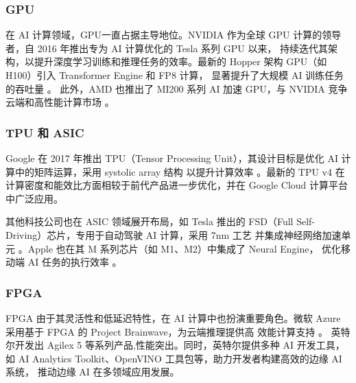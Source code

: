 \subsubsection{GPU}

在 AI 计算领域，GPU一直占据主导地位。NVIDIA 作为全球 GPU 计算的领导者，自 2016 年推出专为 AI 计算优化的 Tesla 系列 GPU 以来，
持续迭代其架构，以提升深度学习训练和推理任务的效率。最新的 Hopper 架构 GPU（如 H100）引入 Transformer Engine 和 FP8 计算，
显著提升了大规模 AI 训练任务的吞吐量 \cite{choquette2023nvidia}。
此外，AMD 也推出了 MI200 系列 AI 加速 GPU，与 NVIDIA 竞争云端和高性能计算市场 \cite{smith2022amd}。

\subsubsection{TPU 和 ASIC}

Google 在 2017 年推出 TPU（Tensor Processing Unit），其设计目标是优化 AI 计算中的矩阵运算，采用 systolic array 结构
以提升计算效率 \cite{jouppi2017datacenter}。最新的 TPU v4 在计算密度和能效比方面相较于前代产品进一步优化，并在 Google Cloud 计算平台中广泛应用。

其他科技公司也在 ASIC 领域展开布局，如 Tesla 推出的 FSD（Full Self-Driving）芯片，专用于自动驾驶 AI 计算，采用 7nm 工艺
并集成神经网络加速单元 \cite{talpes2020compute}。Apple 也在其 M 系列芯片（如 M1、M2）中集成了 Neural Engine，
优化移动端 AI 任务的执行效率 \cite{kasperek2022comparison}。

\subsubsection{FPGA}

FPGA 由于其灵活性和低延迟特性，在 AI 计算中也扮演重要角色。微软 Azure 采用基于 FPGA 的 Project Brainwave，为云端推理提供高
效能计算支持 \cite{microsoft2019brainwave}。
英特尔开发出 Agilex 5 等系列产品,性能突出。同时，英特尔提供多种 AI 开发工具，如 AI Analytics Toolkit、OpenVINO 工具包等，助力开发者构建高效的边缘 AI 系统，
推动边缘 AI 在多领域应用发展\cite{ahmadintel}。

